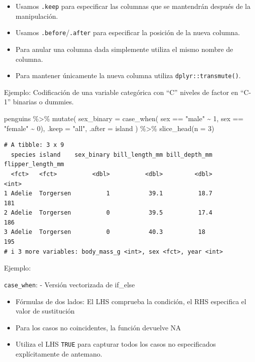 \documentclass[
  letterpaper,
  DIV=11,
  numbers=noendperiod]{scrreprt}
\newenvironment{Shaded}{\begin{snugshade}}{\end{snugshade}}
\newcommand{\AttributeTok}[1]{\textcolor[rgb]{0.40,0.45,0.13}{#1}}
\newcommand{\DecValTok}[1]{\textcolor[rgb]{0.68,0.00,0.00}{#1}}
\newcommand{\FunctionTok}[1]{\textcolor[rgb]{0.28,0.35,0.67}{#1}}
\newcommand{\NormalTok}[1]{\textcolor[rgb]{0.00,0.23,0.31}{#1}}
\newcommand{\SpecialCharTok}[1]{\textcolor[rgb]{0.37,0.37,0.37}{#1}}
\newcommand{\StringTok}[1]{\textcolor[rgb]{0.13,0.47,0.30}{#1}}
\providecommand{\tightlist}{%
  \setlength{\itemsep}{0pt}\setlength{\parskip}{0pt}}\usepackage{longtable,booktabs,array}
\begin{document}
\begin{itemize}
\tightlist
\item
  Usamos \texttt{.keep} para especificar las columnas que se mantendrán
  después de la manipulación.
\item
  Usamos \texttt{.before}/\texttt{.after} para especificar la posición
  de la nueva columna.
\item
  Para anular una columna dada simplemente utiliza el mismo nombre de
  columna.
\item
  Para mantener únicamente la nueva columna utiliza
  \texttt{dplyr::transmute()}.
\end{itemize}

{Ejemplo}: Codificación de una variable categórica con ``C'' niveles de
factor en ``C-1'' binarias o dummies.

\begin{Shaded}
\begin{Highlighting}[]
\NormalTok{penguins }\SpecialCharTok{\%\textgreater{}\%} 
  \FunctionTok{mutate}\NormalTok{(}
    \AttributeTok{sex\_binary =} \FunctionTok{case\_when}\NormalTok{(}
\NormalTok{      sex }\SpecialCharTok{==} \StringTok{"male"} \SpecialCharTok{\textasciitilde{}} \DecValTok{1}\NormalTok{,}
\NormalTok{      sex }\SpecialCharTok{==} \StringTok{"female"} \SpecialCharTok{\textasciitilde{}} \DecValTok{0}\NormalTok{),}
    \AttributeTok{.keep =} \StringTok{"all"}\NormalTok{, }\AttributeTok{.after =}\NormalTok{ island}
\NormalTok{  ) }\SpecialCharTok{\%\textgreater{}\%} 
  \FunctionTok{slice\_head}\NormalTok{(}\AttributeTok{n =} \DecValTok{3}\NormalTok{)}
\end{Highlighting}
\end{Shaded}

\begin{verbatim}
# A tibble: 3 x 9
  species island    sex_binary bill_length_mm bill_depth_mm flipper_length_mm
  <fct>   <fct>          <dbl>          <dbl>         <dbl>             <int>
1 Adelie  Torgersen          1           39.1          18.7               181
2 Adelie  Torgersen          0           39.5          17.4               186
3 Adelie  Torgersen          0           40.3          18                 195
# i 3 more variables: body_mass_g <int>, sex <fct>, year <int>
\end{verbatim}

{Ejemplo}:

\texttt{case\_when}: - Versión vectorizada de if\_else

\begin{itemize}
\item
  Fórmulas de dos lados: El LHS comprueba la condición, el RHS
  especifica el valor de sustitución
\item
  Para los casos no coincidentes, la función devuelve NA
\item
  Utiliza el LHS \texttt{TRUE} para capturar todos los casos no
  especificados explícitamente de antemano.
\end{itemize}
\end{document}
